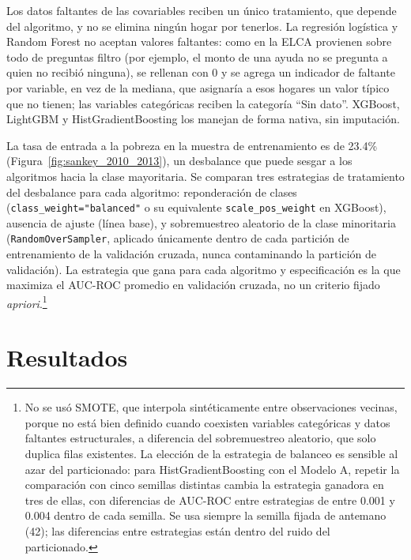 \documentclass[12pt, letterpaper]{article}
\begin{document}
Los datos faltantes de las covariables reciben un único tratamiento, que
depende del algoritmo, y no se elimina ningún hogar por tenerlos. La
regresión logística y Random Forest no aceptan valores faltantes: como en
la ELCA provienen sobre todo de preguntas filtro (por ejemplo, el monto de
una ayuda no se pregunta a quien no recibió ninguna), se rellenan con 0 y
se agrega un indicador de faltante por variable, en vez de la mediana, que
asignaría a esos hogares un valor típico que no tienen; las variables
categóricas reciben la categoría ``Sin dato''. XGBoost, LightGBM y
HistGradientBoosting los manejan de forma nativa, sin imputación.

La tasa de entrada a la pobreza en la muestra de entrenamiento es de
23.4\% (Figura~\ref{fig:sankey_2010_2013}), un desbalance que
puede sesgar a los algoritmos hacia la clase mayoritaria. Se comparan tres
estrategias de tratamiento del desbalance para cada algoritmo:
reponderación de clases (\texttt{class\_weight="balanced"} o su
equivalente \texttt{scale\_pos\_weight} en XGBoost), ausencia de ajuste
(línea base), y sobremuestreo aleatorio de la clase minoritaria
(\texttt{RandomOverSampler}, aplicado únicamente dentro de cada partición
de entrenamiento de la validación cruzada, nunca contaminando la partición
de validación). La estrategia que gana para cada algoritmo y especificación 
es la que maximiza el AUC-ROC promedio en validación cruzada, no un criterio 
fijado \emph{apriori}.\footnote{No se usó SMOTE, que interpola sintéticamente entre
observaciones vecinas, porque no está bien definido cuando coexisten
variables categóricas y datos faltantes estructurales, a diferencia del
sobremuestreo aleatorio, que solo duplica filas existentes. 
La elección de la estrategia de balanceo es sensible al azar del
particionado: para HistGradientBoosting con el Modelo A, repetir la
comparación con cinco semillas distintas cambia la estrategia ganadora en
tres de ellas, con diferencias de AUC-ROC entre estrategias de entre 0.001
y 0.004 dentro de cada semilla. Se usa siempre la semilla fijada de
antemano (42); las diferencias entre estrategias están dentro del ruido
del particionado.}

\section{Resultados}
\label{sec:resultados}
\end{document}
